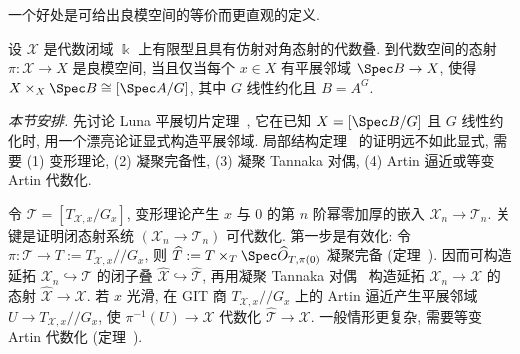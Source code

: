 一个好处是可给出良模空间的等价而更直观的定义.
\begin{corollary}[良模空间的刻画]\label{src:7.7.4}
设 $\mathcal X$ 是代数闭域 $\Bbbk$ 上有限型且具有仿射对角态射的代数叠. 到代数空间的态射 $\pi:\mathcal X\to X$ 是良模空间, 当且仅当每个 $x\in X$ 有平展邻域 $\Spec B\to X$, 使得 $\mathcal X\times_X\Spec B\cong[\Spec A/G]$, 其中 $G$ 线性约化且 $B=A^G$.
\end{corollary}
\emph{本节安排.} 先讨论 Luna 平展切片定理~, 它在已知 $\mathcal X=[\Spec B/G]$ 且 $G$ 线性约化时, 用一个漂亮论证显式构造平展邻域. 局部结构定理~ 的证明远不如此显式, 需要 (1) 变形理论, (2) 凝聚完备性, (3) 凝聚 Tannaka 对偶, (4) Artin 逼近或等变 Artin 代数化.

令 $\mathcal T=[T_{\mathcal X,x}/G_x]$, 变形理论产生 $x$ 与 $0$ 的第 $n$ 阶幂零加厚的嵌入 $\mathcal X_n\to\mathcal T_n$. 关键是证明闭态射系统 $(\mathcal X_n\to\mathcal T_n)$ 可代数化. 第一步是有效化: 令 $\pi:\mathcal T\to T:=T_{\mathcal X,x}//G_x$, 则 $\widehat{\mathcal T}:=\mathcal T\times_T\Spec\widehat{\mathcal O}_{T,\pi(0)}$ 凝聚完备 (定理~). 因而可构造延拓 $\mathcal X_n\hookrightarrow\mathcal T$ 的闭子叠 $\widehat{\mathcal X}\hookrightarrow\widehat{\mathcal T}$, 再用凝聚 Tannaka 对偶~ 构造延拓 $\mathcal X_n\to\mathcal X$ 的态射 $\widehat{\mathcal X}\to\mathcal X$. 若 $x$ 光滑, 在 GIT 商 $T_{\mathcal X,x}//G_x$ 上的 Artin 逼近产生平展邻域 $U\to T_{\mathcal X,x}//G_x$, 使 $\pi^{-1}(U)\to\mathcal X$ 代数化 $\widehat{\mathcal T}\to\mathcal X$. 一般情形更复杂, 需要等变 Artin 代数化 (定理~).

